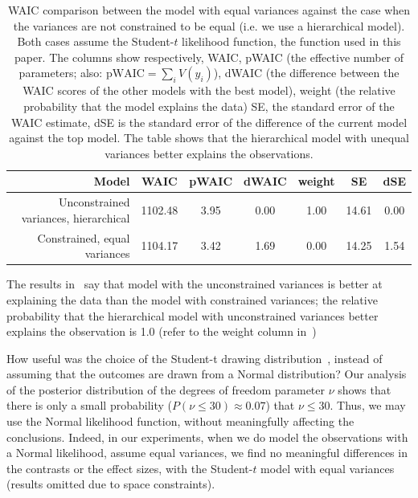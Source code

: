 \begin{table}[htb]%
    \centering
        \caption{WAIC comparison between the model with equal variances against the case when the variances are not constrained to be equal (i.e. we use a hierarchical model). Both cases assume the Student-$t$ likelihood function, the function used in this paper. The columns show respectively, WAIC, pWAIC (the effective number of parameters; also: $\mathrm{pWAIC}=\sum_i V(y_i)$), dWAIC (the difference between the WAIC scores of the other models with the best model), weight (the relative probability that the model explains the data) SE, the standard error of the WAIC estimate, dSE is the standard error of the difference of the current model against the top model. The table shows that the hierarchical model with unequal variances better explains the observations. }\label{tab:WAIC comparison}
        \begin{tabular}{rcccccc} \toprule
            Model & WAIC & pWAIC & dWAIC & weight & SE & dSE \\ \midrule
             Unconstrained variances, hierarchical	& 1102.48	& 3.95 & 	0.00 & 	1.00 & 	14.61 & 	0.00	\\
            Constrained, equal variances & 1104.17 & 3.42 & 1.69 & 0.00 & 14.25 & 1.54		\\ \bottomrule
        \end{tabular}
    
    \end{table}

The results in~ say that model with the unconstrained variances is better at explaining the data than the model with constrained variances; the relative probability that the hierarchical model with unconstrained variances better explains the observation is 1.0 (refer to the weight column in~)

How useful was the choice of the Student-t drawing distribution~, instead of assuming that the outcomes are drawn from a Normal distribution? Our analysis of the posterior distribution of the degrees of freedom parameter $\nu$ shows that there is only a small probability ($P(\nu \leq 30) \approx 0.07$) that $\nu \leq 30$. Thus, we may use the Normal likelihood function, without meaningfully affecting the conclusions. Indeed, in our experiments, when we do model the observations with a Normal likelihood, assume equal variances, we find no meaningful differences in the contrasts or the effect sizes, with the Student-$t$ model with equal variances (results omitted due to space constraints).


